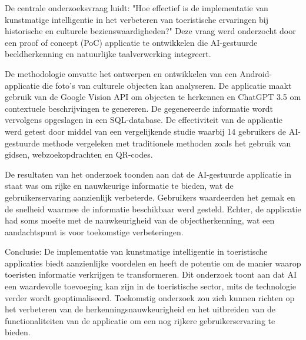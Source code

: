 De centrale onderzoeksvraag luidt: "Hoe effectief is de implementatie van kunstmatige intelligentie in het verbeteren van toeristische ervaringen bij historische en culturele bezienswaardigheden?" Deze vraag werd onderzocht door een proof of concept (PoC) applicatie te ontwikkelen die AI-gestuurde beeldherkenning en natuurlijke taalverwerking integreert.

De methodologie omvatte het ontwerpen en ontwikkelen van een Android-applicatie die foto's van culturele objecten kan analyseren. De applicatie maakt gebruik van de Google Vision API om objecten te herkennen en ChatGPT 3.5 om contextuele beschrijvingen te genereren. De gegenereerde informatie wordt vervolgens opgeslagen in een SQL-database. De effectiviteit van de applicatie werd getest door middel van een vergelijkende studie waarbij 14 gebruikers de AI-gestuurde methode vergeleken met traditionele methoden zoals het gebruik van gidsen, webzoekopdrachten en QR-codes.

De resultaten van het onderzoek toonden aan dat de AI-gestuurde applicatie in staat was om rijke en nauwkeurige informatie te bieden, wat de gebruikerservaring aanzienlijk verbeterde. Gebruikers waardeerden het gemak en de snelheid waarmee de informatie beschikbaar werd gesteld. Echter, de applicatie had soms moeite met de nauwkeurigheid van de objectherkenning, wat een aandachtspunt is voor toekomstige verbeteringen.

Conclusie: De implementatie van kunstmatige intelligentie in toeristische applicaties biedt aanzienlijke voordelen en heeft de potentie om de manier waarop toeristen informatie verkrijgen te transformeren. Dit onderzoek toont aan dat AI een waardevolle toevoeging kan zijn in de toeristische sector, mits de technologie verder wordt geoptimaliseerd. Toekomstig onderzoek zou zich kunnen richten op het verbeteren van de herkenningsnauwkeurigheid en het uitbreiden van de functionaliteiten van de applicatie om een nog rijkere gebruikerservaring te bieden.
